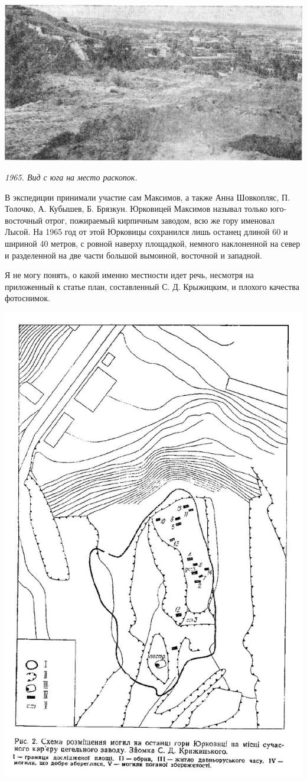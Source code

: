 \begin{center}
\includegraphics[width=\linewidth]{chast-kirvys/lys02/maxfoto.jpg}

\textit{1965. Вид с юга на место раскопок.}
\end{center}

В экспедиции принимали участие сам Максимов, а также Анна Шовкопляс, П. Толочко, А. Кубышев, Б. Брязкун. Юрковицей Максимов называл только юго-восточ\-ный отрог, пожираемый кирпичным заводом, всю же гору именовал Лысой. На 1965 год от этой Юрковицы сохранился лишь останец длиной 60 и шириной 40 метров, с ровной наверху площадкой, немного наклоненной на север и разделенной на две части большой вымоиной, восточной и западной.

Я не могу понять, о какой именно местности идет речь, несмотря на приложенный к статье план, составленный С. Д. Крыжицким, и плохого качества фотоснимок.

\begin{center}
\includegraphics[width=0.80\linewidth]{chast-kirvys/lys02/maxplan2.jpg}
\end{center}

